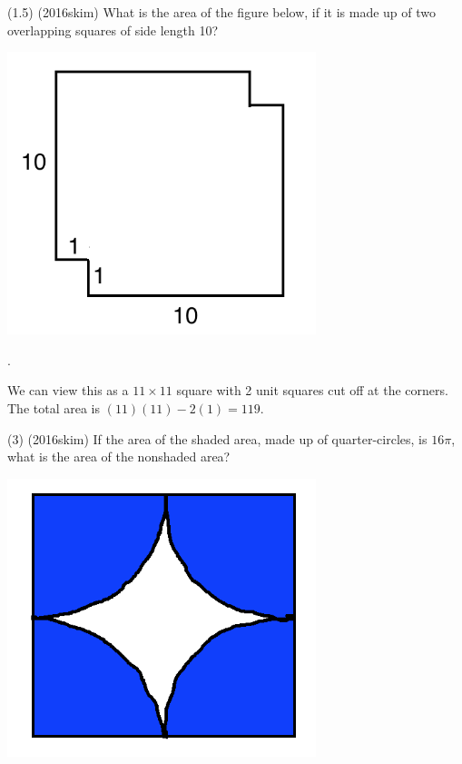 \documentclass{article}
\begin{document}
\begin{problem}
(1.5) (2016skim) What is the area of the figure below, if it is made up of two overlapping squares of side length 10?
\begin{center}
\includegraphics[width=9cm]{squares.png}
\end{center}
\end{problem}

\begin{answer}
.
\end{answer}

\begin{solution}
We can view this as a $11\times11$ square with 2 unit squares cut off at the corners. The total area is $(11)(11)-2(1) = 119$.
\end{solution}


\begin{problem}
(3) (2016skim) If the area of the shaded area, made up of quarter-circles, is $16\pi$, what is the area of the nonshaded area?
\begin{center}
\includegraphics[width=9cm]{asteroid.png}
\end{center}
\end{problem}
\end{document}
